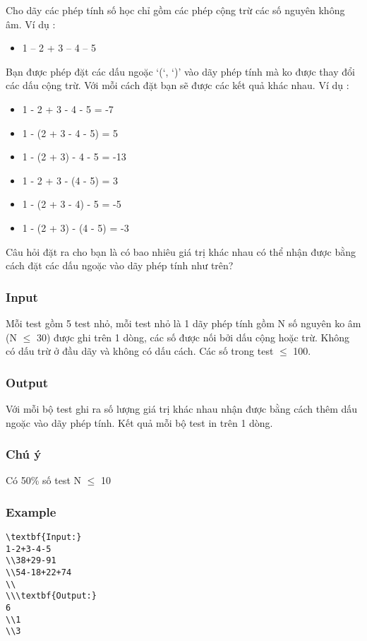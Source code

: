 



   Cho dãy các phép tính số học chỉ gồm các phép cộng trừ các số nguyên không âm. Ví dụ :  
\begin{itemize}
	\item     1 – 2 + 3 – 4 – 5   
\end{itemize}

   Bạn  được phép đặt các dấu ngoặc ‘(‘, ‘)’ vào dãy phép tính mà ko được thay  đổi các dấu cộng trừ. Với mỗi cách đặt bạn sẽ được các kết quả khác  nhau. Ví dụ :  
\begin{itemize}
	\item     1 - 2 + 3 - 4 - 5 = -7   
	\item     1 - (2 + 3 - 4 - 5) = 5   
	\item     1 - (2 + 3) - 4 - 5 = -13   
	\item     1 - 2 + 3 - (4 - 5) = 3   
	\item     1 - (2 + 3 - 4) - 5 = -5   
	\item     1 - (2 + 3) - (4 - 5) = -3   
\end{itemize}

   Câu hỏi đặt ra cho bạn là có bao nhiêu giá trị khác nhau có thể nhận  được bằng cách đặt các dấu ngoặc vào dãy phép tính như trên?  

\subsubsection{   Input  }

   Mỗi test gồm 5 test nhỏ, mỗi test nhỏ là 1 dãy phép tính gồm N số nguyên ko âm (N  $\le$  30) được ghi trên 1 dòng, các số được nối bởi dấu cộng hoặc trừ. Không có dấu trừ ở đầu dãy và không có dấu cách. Các số trong test  $\le$  100.  

\subsubsection{   Output  }

   Với mỗi bộ test ghi ra số lượng giá trị khác nhau nhận được bằng cách thêm dấu ngoặc vào dãy phép tính. Kết quả mỗi bộ test in trên 1 dòng.  

\subsubsection{   Chú ý  }

   Có 50\% số test N  $\le$  10  

\subsubsection{   Example  }
\begin{verbatim}
\textbf{Input:}
1-2+3-4-5
\\38+29-91
\\54-18+22+74
\\
\\\textbf{Output:}
6
\\1
\\3 \end{verbatim}
